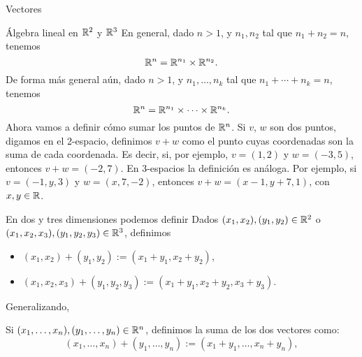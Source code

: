 \begin{chapter}{Vectores}
\begin{section}{\'Algebra lineal en $\mathbb R^2$ y $\mathbb R^3$}
        En  general, dado $n>1$, y $n_1,n_2$ tal que $n_1+n_2 = n$, tenemos
        \begin{equation*}
        \mathbb R^n= \mathbb R^{n_1} \times \mathbb R^{n_2}.
        \end{equation*} 
        De forma más general aún,  dado $n>1$, y $n_1,\ldots,n_k$ tal que $n_1+\cdots+n_k = n$, tenemos
        \begin{equation*}
        \mathbb R^n= \mathbb R^{n_1} \times \cdots\times \mathbb R^{n_k}.
        \end{equation*} 	
        Ahora vamos a definir cómo sumar los puntos de $\mathbb R^n$. Si $v$, $w$ son dos puntos, digamos en el 2-espacio,  definimos $v + w$ como el punto cuyas coordenadas son la suma de cada coordenada. Es decir, si, por ejemplo,  $v= (1, 2)$ y $w= (- 3, 5)$, entonces $v+w = (- 2, 7)$. En 3-espacios la definición es análoga. Por  ejemplo, si $v= (- 1, y, 3)$ y $w= (x, 7, - 2)$, entonces $v+w = (x - 1, y + 7, 1)$, con $x,y \in \mathbb R$.
        
        En  dos y tres dimensiones podemos definir
            Dados $(x_1,x_2), (y_1,y_2) \in \mathbb R^2$ o $(x_1,x_2,x_3), (y_1,y_2,y_3) \in \mathbb R^3$, definimos
        \begin{itemize}
            \item $(x_1,x_2)+ (y_1,y_2):=(x_1+y_1,x_2+y_2)$, 
            \item $(x_1,x_2,x_3)+ (y_1,y_2,y_3):=(x_1+y_1,x_2+y_2,x_3+y_3)$.
        \end{itemize}
        
        Generalizando, 
            \begin{definicion}
            Si $(x_1,\ldots,x_n), (y_1,\ldots,y_n) \in \mathbb R^n$, definimos la suma de los dos vectores como: 
                    \begin{equation*}
                    (x_1,\ldots,x_n)+ (y_1,\ldots,y_n):=(x_1+y_1,\ldots,x_n+y_n), 
                \end{equation*}
            \end{definicion}
            

\end{section}
\end{chapter}
